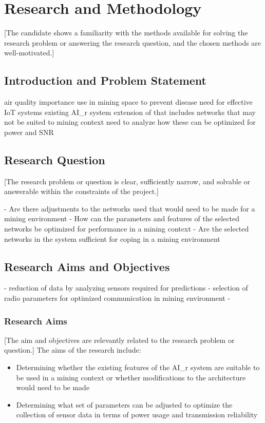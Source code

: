 \documentclass[a4paper,twoside,12pt]{report}
\begin{document}
\chapter{Research and Methodology}
[The candidate shows a familiarity with the
methods available for solving the research
problem or answering the research question,
and the chosen methods are well-motivated.]

\section{Introduction and Problem Statement}
air quality importance
use in mining space to prevent disease
need for effective IoT systems
existing AI\_r system
extension of that includes networks that may not be suited to mining context
need to analyze how these can be optimized for power and SNR

\section{Research Question}
[The research problem or question is clear, sufficiently narrow, and solvable or answerable
within the constraints of the project.]
\newline


- Are there adjustments to the networks used that would need to be made for a mining environment
- How can the parameters and features of the selected networks be optimized for performance in a mining context
- Are the selected networks in the system sufficient for coping in a mining environment
\section{Research Aims and Objectives}

- reduction of data by analyzing sensors required for predictions
- selection of radio parameters for optimized communication in mining environment
- 

\subsection{Research Aims}
[The aim and objectives are relevantly related
to the research problem or question.]
\newline
The aims of the research include:
\begin{itemize}
    \item Determining whether the existing features of the AI\_r system are suitable to be used in a mining context or whether modifications to the architecture would need to be made
    \item Determining what set of parameters can be adjusted to optimize the collection of sensor data in terms of power usage and transmission reliability
\end{itemize}
\end{document}
